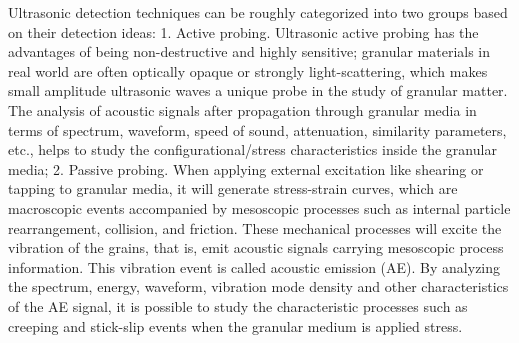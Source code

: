 \begin{digest}
    Ultrasonic detection techniques can be roughly categorized into two groups based on their detection ideas: 
    1. Active probing. Ultrasonic active probing has the advantages of being non-destructive and highly sensitive; granular materials in real world are often optically opaque or strongly light-scattering, which makes small amplitude ultrasonic waves a unique probe in the study of granular matter.
    The analysis of acoustic signals after propagation through granular media in terms of spectrum, waveform, speed of sound, attenuation, similarity parameters, etc., helps to study the configurational/stress characteristics inside the granular media;
    2. Passive probing. When applying external excitation like shearing or tapping to granular media, it will generate stress-strain curves, which are macroscopic events accompanied by mesoscopic processes such as internal particle rearrangement, collision, and friction. These mechanical processes will excite the vibration of the grains, that is, emit acoustic signals carrying mesoscopic process information. This vibration event is called acoustic emission (AE).
    By analyzing the spectrum, energy, waveform, vibration mode density and other characteristics of the AE signal, it is possible to study the characteristic processes such as creeping and stick-slip events when the granular medium is applied stress.
    


\end{digest}

